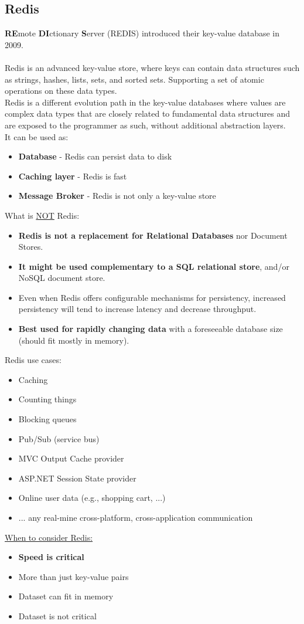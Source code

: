 \documentclass[10pt,a4paper]{article}
\newcommand{\nline}{\\~\\}
\begin{document}
\subsection{Redis}
\textbf{RE}mote \textbf{DI}ctionary \textbf{S}erver (REDIS) introduced their key-value database in 2009. \nline
Redis is an advanced key-value store, where keys can contain data structures such as strings, hashes, lists, sets, and sorted sets. Supporting a set of atomic operations on these data types. \\
Redis is a different evolution path in the key-value databases where values are complex data types that are closely related to fundamental data structures and are exposed to the programmer as such, without additional abstraction layers. \\
It can be used as:
\begin{itemize}
	\item \textbf{Database} - Redis can persist data to disk
	\item \textbf{Caching layer} - Redis is fast
	\item \textbf{Message Broker} - Redis is not only a key-value store
\end{itemize}
What is \uline{NOT} Redis:
\begin{itemize}
	\item \textbf{Redis is not a replacement for Relational Databases} nor Document Stores.
	\item \textbf{It might be used complementary to a SQL relational store}, and/or NoSQL document store.
	\item Even when Redis offers configurable mechanisms for persistency, increased persistency will tend to increase latency and decrease throughput.
	\item \textbf{Best used for rapidly changing data} with a foreseeable database size (should fit mostly in memory).
\end{itemize}
Redis use cases:
\begin{itemize}
	\item Caching
	\item Counting things
	\item Blocking queues
	\item Pub/Sub (service bus)
	\item MVC Output Cache provider
	\item ASP.NET Session State provider
	\item Online user data (e.g., shopping cart, ...)
	\item ... any real-mine cross-platform, cross-application communication
\end{itemize}
\uline{When to consider Redis:}
\begin{itemize}
	\item \textbf{Speed is critical}
	\item More than just key-value pairs
	\item Dataset can fit in memory
	\item Dataset is not critical
\end{itemize}
\end{document}
